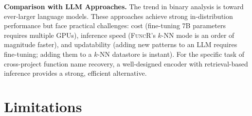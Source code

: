 \documentclass[sigconf,nonacm]{acmart}
\newcommand{\sysname}{\textsc{FuncR}}
\begin{document}
\textbf{Comparison with LLM Approaches.}
The trend in binary analysis is toward ever-larger language models. These approaches achieve strong in-distribution performance but face practical challenges: cost (fine-tuning 7B parameters requires multiple GPUs), inference speed (\sysname{}'s $k$-NN mode is an order of magnitude faster), and updatability (adding new patterns to an LLM requires fine-tuning; adding them to a $k$-NN datastore is instant). For the specific task of cross-project function name recovery, a well-designed encoder with retrieval-based inference provides a strong, efficient alternative.

\section{Limitations}
\label{sec:limitations}
\end{document}
